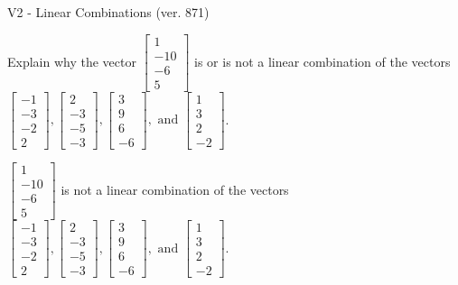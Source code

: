 \begin{exercise}
  \begin{exerciseTitle}V2 - Linear Combinations (ver. 871)\end{exerciseTitle}
  \begin{exerciseStatement}
    Explain why the vector \(\left[\begin{array}{c}
1 \\
-10 \\
-6 \\
5
\end{array}\right]\)  is or is not a linear 
	combination of the vectors \(\left[\begin{array}{c}
-1 \\
-3 \\
-2 \\
2
\end{array}\right] , \left[\begin{array}{c}
2 \\
-3 \\
-5 \\
-3
\end{array}\right] , \left[\begin{array}{c}
3 \\
9 \\
6 \\
-6
\end{array}\right] , \text{ and } \left[\begin{array}{c}
1 \\
3 \\
2 \\
-2
\end{array}\right]\).
	


  \end{exerciseStatement}
  \begin{exerciseAnswer}
   \(\left[\begin{array}{c}
1 \\
-10 \\
-6 \\
5
\end{array}\right]\) 
  	 is not  
	a linear combination of the vectors \(\left[\begin{array}{c}
-1 \\
-3 \\
-2 \\
2
\end{array}\right] , \left[\begin{array}{c}
2 \\
-3 \\
-5 \\
-3
\end{array}\right] , \left[\begin{array}{c}
3 \\
9 \\
6 \\
-6
\end{array}\right] , \text{ and } \left[\begin{array}{c}
1 \\
3 \\
2 \\
-2
\end{array}\right]\).


\end{exerciseAnswer}
\end{exercise}
